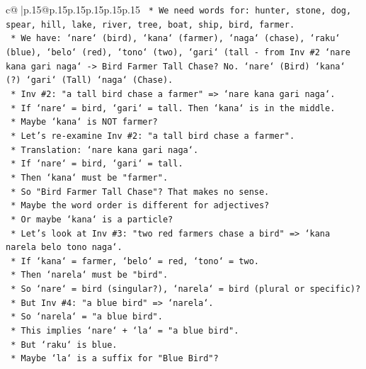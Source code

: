 \documentclass{article}
\begin{document}
{\begin{supertabular}{c@{$\;$}|p{.15\linewidth}@{}p{.15\linewidth}p{.15\linewidth}p{.15\linewidth}p{.15\linewidth}p{.15\linewidth}}
{{{\texttt{        *   We need words for: hunter, stone, dog, spear, hill, lake, river, tree, boat, ship, bird, farmer.} \\
\texttt{        *   We have: `nare` (bird), `kana` (farmer), `naga` (chase), `raku` (blue), `belo` (red), `tono` (two), `gari` (tall {-} from Inv \#2 `nare kana gari naga` {-}> Bird Farmer Tall Chase? No. `nare` (Bird) `kana` (?) `gari` (Tall) `naga` (Chase).} \\
\texttt{            *   Inv \#2: "a tall bird chase a farmer" => `nare kana gari naga`.} \\
\texttt{            *   If `nare` = bird, `gari` = tall. Then `kana` is in the middle.} \\
\texttt{            *   Maybe `kana` is NOT farmer?} \\
\texttt{            *   Let's re{-}examine Inv \#2: "a tall bird chase a farmer".} \\
\texttt{            *   Translation: `nare kana gari naga`.} \\
\texttt{            *   If `nare` = bird, `gari` = tall.} \\
\texttt{            *   Then `kana` must be "farmer".} \\
\texttt{            *   So "Bird Farmer Tall Chase"? That makes no sense.} \\
\texttt{            *   Maybe the word order is different for adjectives?} \\
\texttt{            *   Or maybe `kana` is a particle?} \\
\texttt{            *   Let's look at Inv \#3: "two red farmers chase a bird" => `kana narela belo tono naga`.} \\
\texttt{            *   If `kana` = farmer, `belo` = red, `tono` = two.} \\
\texttt{            *   Then `narela` must be "bird".} \\
\texttt{            *   So `nare` = bird (singular?), `narela` = bird (plural or specific)?} \\
\texttt{            *   But Inv \#4: "a blue bird" => `narela`.} \\
\texttt{            *   So `narela` = "a blue bird".} \\
\texttt{            *   This implies `nare` + `la` = "a blue bird".} \\
\texttt{            *   But `raku` is blue.} \\
\texttt{            *   Maybe `la` is a suffix for "Blue Bird"?} \\
}}}
\end{supertabular}}
\end{document}
